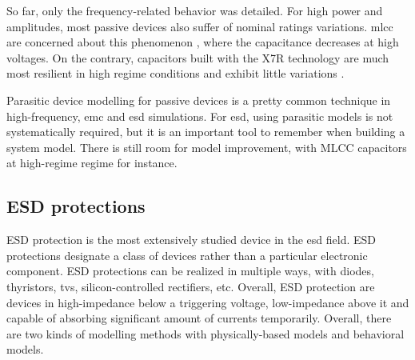 
So far, only the frequency-related behavior was detailed.
For high power and amplitudes, most passive devices also suffer of nominal ratings variations.
\gls{mlcc} are concerned about this phenomenon \cite{capa-esd-cz}, where the capacitance decreases at high voltages.
On the contrary, capacitors built with the X7R technology are much most resilient in high regime conditions and exhibit little variations \cite{fabien-capas}.

Parasitic device modelling for passive devices is a pretty common technique in high-frequency, \gls{emc} and \gls{esd} simulations.
For \gls{esd}, using parasitic models is not systematically required, but it is an important tool to remember when building a system model.
There is still room for model improvement, with MLCC capacitors at high-regime regime for instance.

\subsection{ESD protections}
\label{esd-protection-modelling}

%
ESD protection is the most extensively studied device in the \gls{esd} field.
ESD protections designate a class of devices rather than a particular electronic component.
ESD protections can be realized in multiple ways, with diodes, thyristors, \gls{tvs}, silicon-controlled rectifiers, etc.
Overall, ESD protection are devices in high-impedance below a triggering voltage, low-impedance above it and capable of absorbing significant amount of currents temporarily.
Overall, there are two kinds of modelling methods with physically-based models and behavioral models.

